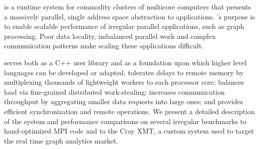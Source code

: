 \Grappa is a runtime system for commodity clusters of multicore computers that
presents a massively parallel, single address space abstraction to
applications. \Grappa's purpose is to enable scalable performance of irregular
parallel applications, such as graph processing. Poor data locality,
imbalanced parallel work and complex communication patterns make scaling these
applications difficult.

\Grappa serves both as a C++ user library and as a foundation upon which
higher level languages can be developed or adapted. \Grappa tolerates delays
to remote memory by multiplexing thousands of lightweight workers to each
processor core; balances load via fine-grained distributed work-stealing;
increases communication throughput by aggregating smaller data requests into
large ones; and provides efficient synchronization and remote operations. We
present a detailed description of the \Grappa system and performance
comparisons on several irregular benchmarks to hand-optimized MPI code and to
the Cray XMT, a custom system used to target the real time graph analytics
market.
